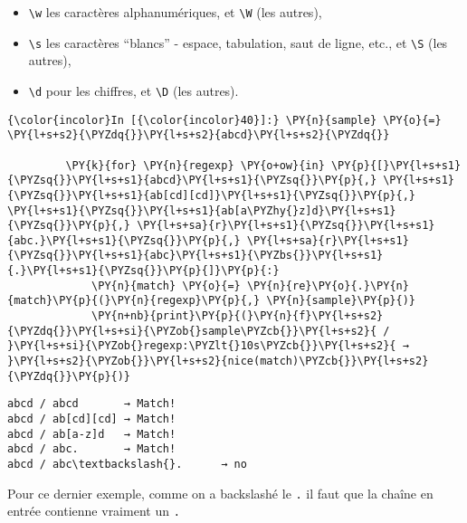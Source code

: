 \begin{itemize}
  \begin{itemize}
  \tightlist
  \item
    \texttt{\textbackslash{}w} les caractères alphanumériques, et
    \texttt{\textbackslash{}W} (les autres),
  \item
    \texttt{\textbackslash{}s} les caractères ``blancs'' - espace,
    tabulation, saut de ligne, etc., et \texttt{\textbackslash{}S} (les
    autres),
  \item
    \texttt{\textbackslash{}d} pour les chiffres, et
    \texttt{\textbackslash{}D} (les autres).
  \end{itemize}
\end{itemize}

    \begin{Verbatim}[commandchars=\\\{\},frame=single,framerule=0.3mm,rulecolor=\color{cellframecolor}]
{\color{incolor}In [{\color{incolor}40}]:} \PY{n}{sample} \PY{o}{=} \PY{l+s+s2}{\PYZdq{}}\PY{l+s+s2}{abcd}\PY{l+s+s2}{\PYZdq{}}
         
         \PY{k}{for} \PY{n}{regexp} \PY{o+ow}{in} \PY{p}{[}\PY{l+s+s1}{\PYZsq{}}\PY{l+s+s1}{abcd}\PY{l+s+s1}{\PYZsq{}}\PY{p}{,} \PY{l+s+s1}{\PYZsq{}}\PY{l+s+s1}{ab[cd][cd]}\PY{l+s+s1}{\PYZsq{}}\PY{p}{,} \PY{l+s+s1}{\PYZsq{}}\PY{l+s+s1}{ab[a\PYZhy{}z]d}\PY{l+s+s1}{\PYZsq{}}\PY{p}{,} \PY{l+s+sa}{r}\PY{l+s+s1}{\PYZsq{}}\PY{l+s+s1}{abc.}\PY{l+s+s1}{\PYZsq{}}\PY{p}{,} \PY{l+s+sa}{r}\PY{l+s+s1}{\PYZsq{}}\PY{l+s+s1}{abc}\PY{l+s+s1}{\PYZbs{}}\PY{l+s+s1}{.}\PY{l+s+s1}{\PYZsq{}}\PY{p}{]}\PY{p}{:}
             \PY{n}{match} \PY{o}{=} \PY{n}{re}\PY{o}{.}\PY{n}{match}\PY{p}{(}\PY{n}{regexp}\PY{p}{,} \PY{n}{sample}\PY{p}{)}
             \PY{n+nb}{print}\PY{p}{(}\PY{n}{f}\PY{l+s+s2}{\PYZdq{}}\PY{l+s+si}{\PYZob{}sample\PYZcb{}}\PY{l+s+s2}{ / }\PY{l+s+si}{\PYZob{}regexp:\PYZlt{}10s\PYZcb{}}\PY{l+s+s2}{ → }\PY{l+s+s2}{\PYZob{}}\PY{l+s+s2}{nice(match)\PYZcb{}}\PY{l+s+s2}{\PYZdq{}}\PY{p}{)}
\end{Verbatim}


    \begin{Verbatim}[commandchars=\\\{\},frame=single,framerule=0.3mm,rulecolor=\color{cellframecolor}]
abcd / abcd       → Match!
abcd / ab[cd][cd] → Match!
abcd / ab[a-z]d   → Match!
abcd / abc.       → Match!
abcd / abc\textbackslash{}.      → no
\end{Verbatim}

    Pour ce dernier exemple, comme on a backslashé le \texttt{.} il faut que
la chaîne en entrée contienne vraiment un \texttt{.}


